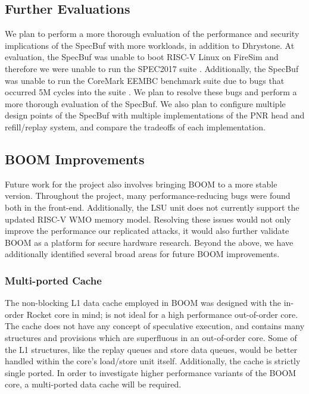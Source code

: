 \subsection{Further Evaluations}

We plan to perform a more thorough evaluation of the performance and security implications of the
SpecBuf with more workloads, in addition to Dhrystone. At evaluation, the SpecBuf was unable to boot
RISC-V Linux on FireSim and therefore we were unable to run the SPEC2017 suite \cite{b50}.
Additionally, the SpecBuf was unable to run the CoreMark EEMBC benchmark suite due to bugs that
occurred 5M cycles into the suite \cite{b51}. We plan to resolve these bugs and perform a more
thorough evaluation of the SpecBuf. We also plan to configure multiple design
points of the SpecBuf with multiple implementations of the PNR head and refill/replay system,
and compare the tradeoffs of each implementation.

\subsection{BOOM Improvements}

Future work for the project also involves bringing BOOM to a more stable version. Throughout
the project, many performance-reducing bugs were found both in the front-end.
Additionally, the LSU unit does not currently support the updated RISC-V WMO memory model.
Resolving these issues would not only improve the performance our replicated attacks,
it would also further validate BOOM as a platform for secure hardware research.
Beyond the above, we have additionally identified several broad areas for future BOOM improvements.

\subsubsection{Multi-ported Cache}

The non-blocking L1 data cache employed in BOOM was designed with the in-order Rocket core in mind;
is not ideal for a high performance out-of-order core. The cache does not have any concept of
speculative execution, and contains many structures and provisions which are superfluous in an
out-of-order core. Some of the L1 structures, like the replay queues and store data queues, would be
better handled within the core's load/store unit itself.
Additionally, the cache is strictly single ported. In order to investigate higher performance variants
of the BOOM core, a multi-ported data cache will be required.

